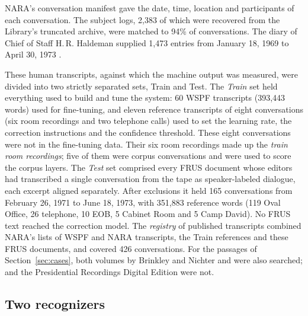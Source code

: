  NARA's conversation manifest gave the date, time, location and participants of each conversation. The subject logs, 2,383 of which were recovered from the Library's truncated archive, were matched to 94\% of conversations. The diary of Chief of Staff H.\,R. Haldeman supplied 1,473 entries from January 18, 1969 to April 30, 1973 \citep{haldeman1994diaries,nixonlib2018haldemandiaries}.

 These human transcripts, against which the machine output was measured, were divided into two strictly separated sets, Train and Test. The \emph{Train} set held everything used to build and tune the system: 60 WSPF transcripts (393,443 words) used for fine-tuning, and eleven reference transcripts of eight conversations (six room recordings and two telephone calls) used to set the learning rate, the correction instructions and the confidence threshold. These eight conversations were not in the fine-tuning data. Their six room recordings made up the \emph{train room recordings}; five of them were corpus conversations and were used to score the corpus layers. The \emph{Test} set comprised every FRUS document whose editors had transcribed a single conversation from the tape as speaker-labeled dialogue, each excerpt aligned separately. After exclusions it held 165 conversations from February 26, 1971 to June 18, 1973, with 351,883 reference words (119 Oval Office, 26 telephone, 10 EOB, 5 Cabinet Room and 5 Camp David). No FRUS text reached the correction model. The \emph{registry} of published transcripts combined NARA's lists of WSPF and NARA transcripts, the Train references and these FRUS documents, and covered 426 conversations. For the passages of Section~\ref{sec:cases}, both volumes by Brinkley and Nichter and \citet{dean2014defense} were also searched; \citet{kutler1997abuse} and the Presidential Recordings Digital Edition were not.

\subsection{Two recognizers}
\label{sec:asr}


